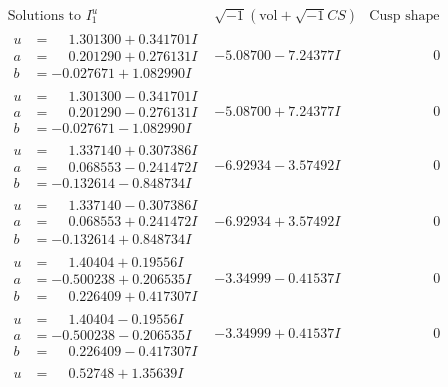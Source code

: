 \documentclass[1p]{elsarticle_modified}
\theoremstyle{definition}
\newcommand{\I}{\sqrt{-1}}
\begin{document}
$$\begin{array}{c|c|c}
\text{Solutions to }I^u_{1}& \I (\text{vol} + \sqrt{-1}CS) & \text{Cusp shape}\\
 \hline 
\begin{aligned}
u &= \phantom{-}1.301300 + 0.341701 I \\
a &= \phantom{-}0.201290 + 0.276131 I \\
b &= -0.027671 + 1.082990 I\end{aligned}
 & -5.08700 - 7.24377 I & \phantom{-0.000000 } 0 \\ \hline\begin{aligned}
u &= \phantom{-}1.301300 - 0.341701 I \\
a &= \phantom{-}0.201290 - 0.276131 I \\
b &= -0.027671 - 1.082990 I\end{aligned}
 & -5.08700 + 7.24377 I & \phantom{-0.000000 } 0 \\ \hline\begin{aligned}
u &= \phantom{-}1.337140 + 0.307386 I \\
a &= \phantom{-}0.068553 - 0.241472 I \\
b &= -0.132614 - 0.848734 I\end{aligned}
 & -6.92934 - 3.57492 I & \phantom{-0.000000 } 0 \\ \hline\begin{aligned}
u &= \phantom{-}1.337140 - 0.307386 I \\
a &= \phantom{-}0.068553 + 0.241472 I \\
b &= -0.132614 + 0.848734 I\end{aligned}
 & -6.92934 + 3.57492 I & \phantom{-0.000000 } 0 \\ \hline\begin{aligned}
u &= \phantom{-}1.40404 + 0.19556 I \\
a &= -0.500238 + 0.206535 I \\
b &= \phantom{-}0.226409 + 0.417307 I\end{aligned}
 & -3.34999 - 0.41537 I & \phantom{-0.000000 } 0 \\ \hline\begin{aligned}
u &= \phantom{-}1.40404 - 0.19556 I \\
a &= -0.500238 - 0.206535 I \\
b &= \phantom{-}0.226409 - 0.417307 I\end{aligned}
 & -3.34999 + 0.41537 I & \phantom{-0.000000 } 0 \\ \hline\begin{aligned}
u &= \phantom{-}0.52748 + 1.35639 I \\

\end{aligned}
\end{array}$$
\end{document}
